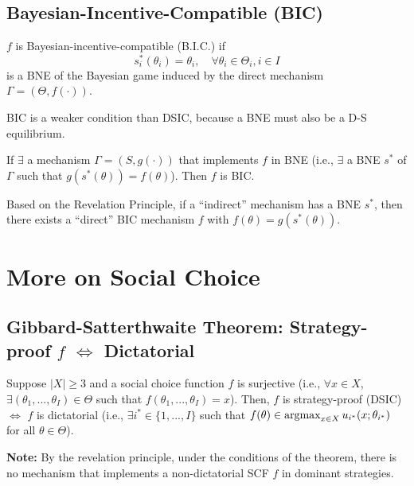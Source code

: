 \documentclass[11pt]{elegantbook_2}
\newcommand{\argmax}{\operatornamewithlimits{argmax}}
\begin{document}
\subsection{Bayesian-Incentive-Compatible (BIC)}
\begin{definition}[BIC]
    $f$ is Bayesian-incentive-compatible (B.I.C.) if $$s^*_i(\theta_i)=\theta_i,\quad \forall \theta_i\in\Theta_i,i\in I$$ is a BNE of the Bayesian game induced by the direct mechanism $\Gamma=(\Theta,f(\cdot))$.
\end{definition}
BIC is a weaker condition than DSIC, because a BNE must also be a D-S equilibrium.

\begin{theorem}\label{theorem:revelation principle BIC}
    If $\exists$ a mechanism $\Gamma=(S,g(\cdot))$ that implements $f$ in BNE (i.e., $\exists$ a BNE $s^*$ of $\Gamma$ such that $g(s^*(\theta))=f(\theta)$). Then $f$ is BIC.
    \begin{note}
        Based on the Revelation Principle, if a ``indirect'' mechanism has a BNE $s^*$, then there exists a ``direct'' BIC mechanism $f$ with $f(\theta)=g(s^*(\theta))$.
    \end{note}
\end{theorem}

\section{More on Social Choice}
\subsection{Gibbard-Satterthwaite Theorem: Strategy-proof $f$ $\Leftrightarrow$ Dictatorial}
\begin{theorem}\label{Gibbard-Satterthwaite_Theorem}
    Suppose $|X|\geq 3$ and a social choice function $f$ is surjective (i.e., $\forall x\in X$, $\exists (\theta_1,...,\theta_I)\in\Theta$ such that $f(\theta_1,...,\theta_I)=x$). Then, $f$ is strategy-proof (DSIC) $\Leftrightarrow$ $f$ is dictatorial (i.e., $\exists i^*\in\{1,...,I\}$ such that $f(\theta)\in \argmax_{x\in X}u_{i^*}(x;\theta_{i^*})$ for all $\theta\in \Theta$).
\end{theorem}
\noindent\textbf{Note:} By the revelation principle, under the conditions of the theorem, there is no mechanism that implements a non-dictatorial SCF $f$ in dominant strategies.
\end{document}
